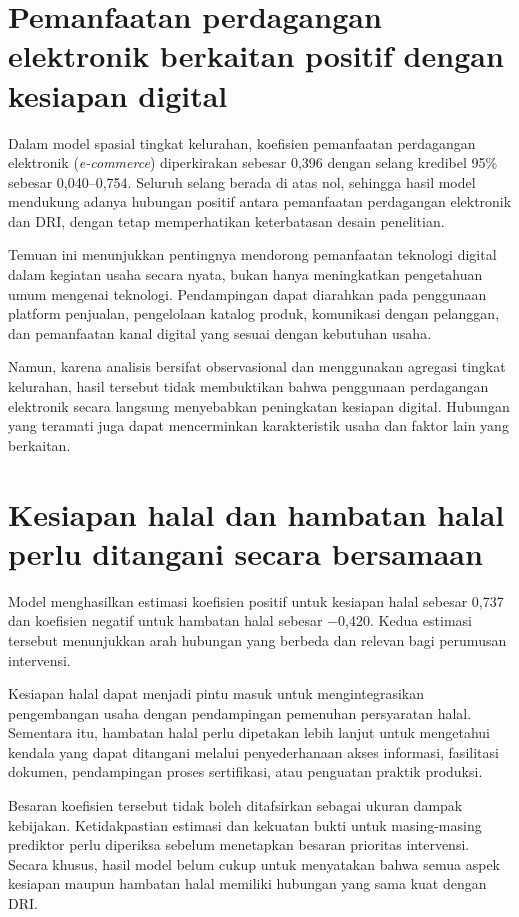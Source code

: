 \documentclass[
  indonesian,
  11pt,
  a4paper,
]{report}
\begin{document}
\section*{Pemanfaatan perdagangan elektronik berkaitan positif dengan
kesiapan
digital}\label{pemanfaatan-perdagangan-elektronik-berkaitan-positif-dengan-kesiapan-digital}

Dalam model spasial tingkat kelurahan, koefisien pemanfaatan perdagangan
elektronik (\emph{e-commerce}) diperkirakan sebesar 0,396 dengan selang
kredibel 95\% sebesar 0,040--0,754. Seluruh selang berada di atas nol,
sehingga hasil model mendukung adanya hubungan positif antara
pemanfaatan perdagangan elektronik dan DRI, dengan tetap memperhatikan
keterbatasan desain penelitian.

Temuan ini menunjukkan pentingnya mendorong pemanfaatan teknologi
digital dalam kegiatan usaha secara nyata, bukan hanya meningkatkan
pengetahuan umum mengenai teknologi. Pendampingan dapat diarahkan pada
penggunaan platform penjualan, pengelolaan katalog produk, komunikasi
dengan pelanggan, dan pemanfaatan kanal digital yang sesuai dengan
kebutuhan usaha.

Namun, karena analisis bersifat observasional dan menggunakan agregasi
tingkat kelurahan, hasil tersebut tidak membuktikan bahwa penggunaan
perdagangan elektronik secara langsung menyebabkan peningkatan kesiapan
digital. Hubungan yang teramati juga dapat mencerminkan karakteristik
usaha dan faktor lain yang berkaitan.

\section*{Kesiapan halal dan hambatan halal perlu ditangani secara
bersamaan}\label{kesiapan-halal-dan-hambatan-halal-perlu-ditangani-secara-bersamaan}

Model menghasilkan estimasi koefisien positif untuk kesiapan halal
sebesar 0,737 dan koefisien negatif untuk hambatan halal sebesar −0,420.
Kedua estimasi tersebut menunjukkan arah hubungan yang berbeda dan
relevan bagi perumusan intervensi.

Kesiapan halal dapat menjadi pintu masuk untuk mengintegrasikan
pengembangan usaha dengan pendampingan pemenuhan persyaratan halal.
Sementara itu, hambatan halal perlu dipetakan lebih lanjut untuk
mengetahui kendala yang dapat ditangani melalui penyederhanaan akses
informasi, fasilitasi dokumen, pendampingan proses sertifikasi, atau
penguatan praktik produksi.

Besaran koefisien tersebut tidak boleh ditafsirkan sebagai ukuran dampak
kebijakan. Ketidakpastian estimasi dan kekuatan bukti untuk
masing-masing prediktor perlu diperiksa sebelum menetapkan besaran
prioritas intervensi. Secara khusus, hasil model belum cukup untuk
menyatakan bahwa semua aspek kesiapan maupun hambatan halal memiliki
hubungan yang sama kuat dengan DRI.
\end{document}
